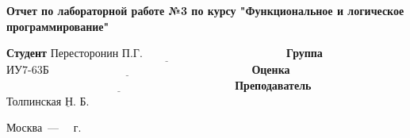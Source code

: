 \begin{titlepage}
    \begin{center}
        \Large\textbf{Отчет по лабораторной работе №3 по курсу "Функциональное и логическое программирование"}
    \end{center}

    \noindent\textbf{Студент} $\underline{\text{Пересторонин П.Г.~~~~~~~~~~~~~~~~~~~~~~~~~~~~~~~~~~~~~~}}$\newline\newline
    \noindent\textbf{Группа} $\underline{\text{ИУ7-63Б~~~~~~~~~~~~~~~~~~~~~~~~~~~~~~~~~~~~~~~~~~~~~~~~~~~~~~}}$\newline\newline
    \noindent\textbf{Оценка} $\underline{\text{~~~~~~~~~~~~~~~~~~~~~~~~~~~~~~~~~~~~~~~~~~~~~~~~~~~~~~~~~~~~~}}$\newline\newline
    \noindent\textbf{Преподаватель} $\underline{\text{Толпинская Н. Б.~~~~~~~~~~~}}$\newline

    \begin{center}
        \vfill
        Москва~---~\the\year
        ~г.
    \end{center}
    \restoregeometry
\end{titlepage}
